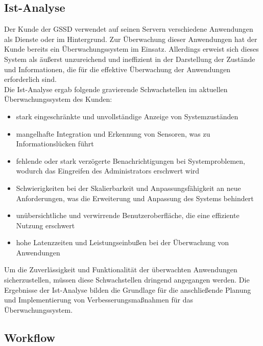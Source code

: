 \begin{flushleft}
	\subsection{Ist-Analyse}
	Der Kunde der \acs{GSSD} verwendet auf seinen Servern verschiedene Anwendungen als Dienste oder im Hintergrund. Zur Überwachung dieser Anwendungen hat der Kunde bereits ein Überwachungssystem im Einsatz. Allerdings erweist sich dieses System als äußerst unzureichend und ineffizient in der Darstellung der Zustände und Informationen, die für die effektive Überwachung der Anwendungen erforderlich sind.
	\\
	Die Ist-Analyse ergab folgende gravierende Schwachstellen im aktuellen Überwachungssystem des Kunden:
	\begin{itemize}
	\item stark eingeschränkte und unvollständige Anzeige von Systemzuständen
	\item mangelhafte Integration und Erkennung von Sensoren, was zu Informationslücken führt
	\item fehlende oder stark verzögerte Benachrichtigungen bei Systemproblemen, wodurch das Eingreifen des Administrators erschwert wird
	\item Schwierigkeiten bei der Skalierbarkeit und Anpassungsfähigkeit an neue Anforderungen, was die Erweiterung und Anpassung des Systems behindert
	\item unübersichtliche und verwirrende Benutzeroberfläche, die eine effiziente Nutzung erschwert
	\item hohe Latenzzeiten und Leistungseinbußen bei der Überwachung von Anwendungen
	\end{itemize}

	Um die Zuverlässigkeit und Funktionalität der überwachten Anwendungen sicherzustellen, müssen diese Schwachstellen dringend angegangen werden. Die Ergebnisse der Ist-Analyse bilden die Grundlage für die anschließende Planung und Implementierung von Verbesserungsmaßnahmen für das Überwachungssystem.
	\subsection{Workflow}


\end{flushleft}

